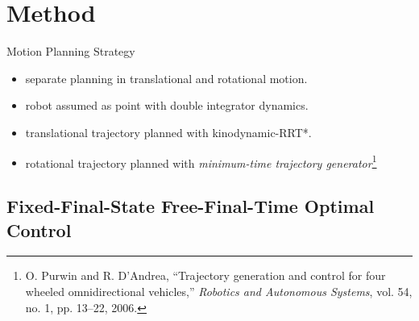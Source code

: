 \documentclass{beamer}
\begin{document}
\section{Method}

\begin{frame}{Motion Planning Strategy}
\begin{itemize}
\item separate planning in translational and rotational motion.
\item robot assumed as point with double integrator dynamics.
\item translational trajectory planned with kinodynamic-RRT*.
\item rotational trajectory planned with \emph{minimum-time trajectory generator}\footnote{O. Purwin and R. D’Andrea, “Trajectory generation and control for four wheeled omnidirectional vehicles,” \emph{Robotics and Autonomous Systems}, vol. 54, no. 1, pp. 13–22, 2006.}
\end{itemize}
\end{frame}

\subsection{Fixed-Final-State Free-Final-Time Optimal Control}
\end{document}
